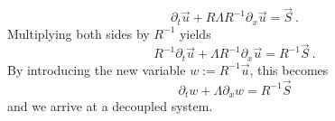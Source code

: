 \begin{equation}
	\partial_t \vec{u} +  R \Lambda R^{-1} \partial_x \vec{u} = \vec{S}~.
\end{equation}
Multiplying both sides by $R^{-1}$ yields
\begin{equation}
	R^{-1} \partial_t \vec{u} +  \Lambda R^{-1} \partial_x \vec{u} = R^{-1} \vec{S}~.
\end{equation}
By introducing the new variable $w := R^{-1} \vec{u}$, this becomes
\begin{equation}
\partial_t w +  \Lambda \partial_x w = R^{-1} \vec{S}
\end{equation}
and we arrive at a decoupled system.



